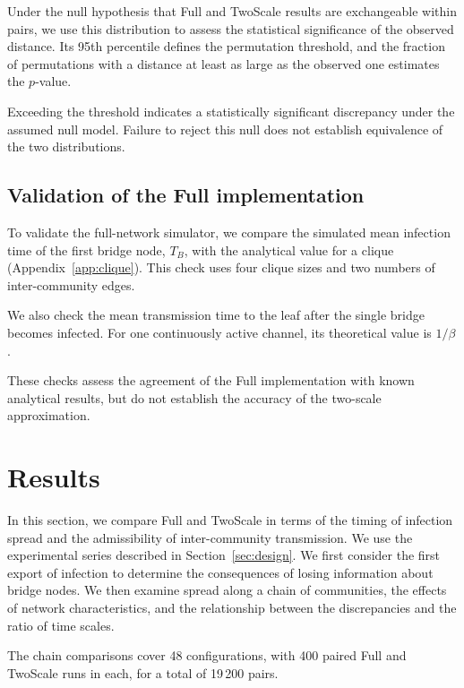 \documentclass{ieeeaccess}
\newcommand{\michael}[2]{{\color{RoyalBlue}#1}}
\newcommand{\Full}{\textup{Full}}
\newcommand{\TS}{\textup{TwoScale}}
\begin{document}
Under the null hypothesis that \Full{} and \TS{} results are exchangeable within pairs, we use this distribution to assess the statistical significance of the observed distance. Its 95th percentile defines the permutation threshold, and the fraction of permutations with a distance at least as large as the observed one estimates the $p$-value.

\michael{Exceeding the threshold indicates a statistically significant discrepancy under the assumed null model. Failure to reject this null does not establish equivalence of the two distributions.}{Exceeding the threshold indicates a statistically significant discrepancy under the assumed null model.}

\subsection{Validation of the Full implementation}

To validate the full-network simulator, we compare the simulated mean infection time of the first bridge node, $T_B$, with the analytical value for a clique (Appendix~\ref*{app:clique}). This check uses four clique sizes and two numbers of inter-community edges.

We also check the mean transmission time to the leaf after the single bridge becomes infected. For one continuously active channel, its theoretical value is $1/\beta$.

These checks assess the agreement of the \Full{} implementation with known analytical results, but do not establish the accuracy of the two-scale approximation.

\section{Results}
\label{sec:results}

In this section, we compare \Full{} and \TS{} in terms of the timing of infection spread and the admissibility of inter-community transmission. We use the experimental series described in Section~\ref{sec:design}. We first consider the first export of infection to determine the consequences of losing information about bridge nodes. We then examine spread along a chain of communities, the effects of network characteristics, and the relationship between the discrepancies and the ratio of time scales.

The chain comparisons cover 48 configurations, with 400 paired \Full{} and \TS{} runs in each, for a total of 19\,200 pairs.
\end{document}
